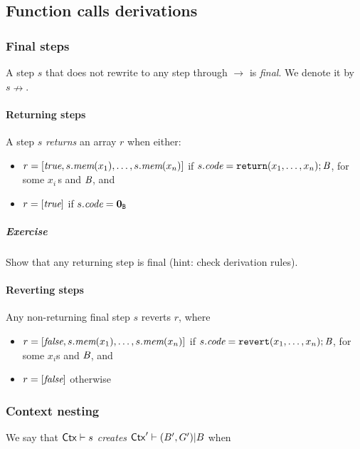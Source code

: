 \subsection{Function calls derivations}
\subsubsection{Final steps}
A step $s$ that does not rewrite to any step through $\rightarrow$ is \emph{final}. We denote it by $s \nrightarrow$. 
\paragraph{Returning steps}

A step $s$ \emph{returns} an array $r$ when either:
\begin{itemize}
    \item $r = [\textit{true},s.\textit{mem}(x_1),\dots,s.\textit{mem}(x_n)]$ if $s.\textit{code} = \mathtt{return}(x_1,\dots,x_n);\textit{B}$, for some $x_i$\,s and $\textit{B}$, and
    \item $r = [\textit{true}]$ if $s.\textit{code} = \mathbf{0}_{\texttt{B}}$
\end{itemize}
\subparagraph{Exercise} Show that any returning step is final (hint: check derivation rules).
 


\paragraph{Reverting steps}
Any non-returning final step $s$ reverts $r$, where
\begin{itemize}
    \item $r = \left[{\textit{false}, s.\textit{mem}(x_1),\dots, s.\textit{mem}(x_n)}\right]$ if $s.\textit{code} = \mathtt{revert}(x_1,\dots,x_n);\textit{B}$, for some $x_i$s and $\textit{B}$, and
    \item $r = \left[{\textit{false}}\right]$ otherwise
\end{itemize}

\subsubsection{Context nesting}
We say that \emph{$\mathsf{Ctx}\vdash s$ creates $\mathsf{Ctx}'\vdash(B',G')| B$} when

